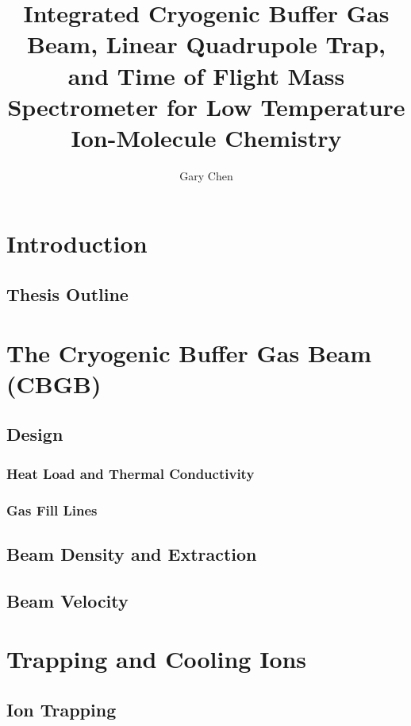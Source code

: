 \documentclass [PhD,nolistoftables,scheader] {uclathes}
\title          {Integrated Cryogenic Buffer Gas Beam, Linear Quadrupole Trap, and Time of Flight Mass Spectrometer for Low Temperature Ion-Molecule Chemistry}
\author         {Gary Chen}
\begin{document}
\makeintropages


\chapter{Introduction}
	
	
	\section{Thesis Outline}
	

\chapter{The Cryogenic Buffer Gas Beam (CBGB)}


	\section{Design}
	
	
		\subsection{Heat Load and Thermal Conductivity}
		
		
		\subsection{Gas Fill Lines}
		
	
	\section{Beam Density and Extraction}
	
	
	\section{Beam Velocity}
	

\chapter{Trapping and Cooling Ions}


	\section{Ion Trapping}
	
	
\end{document}
